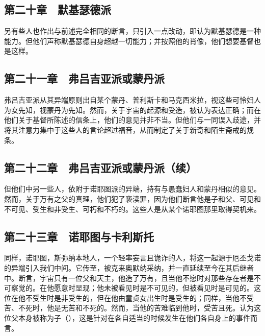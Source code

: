 
\subsection{第二十章　默基瑟德派}

另有些人也作出与前述完全相同的断言，只引入一点改动，即认为默基瑟德是一种能力。但他们声称默基瑟德自身超越一切能力；并按照他的肖像，他们想要基督也是这样。\par


\subsection{第二十一章　弗吕吉亚派或蒙丹派}

弗吕吉亚派从其异端原则出自某个蒙丹、普利斯卡和马克西米拉，视这些可怜妇人为女先知，视蒙丹为先知。然而，关于宇宙的起源和受造，被认为表达正确；而在他们关于基督所陈述的信条上，他们的意见并非不当。但他们与一同误入歧途，并将其注意力集中于这些人的言论超过福音，从而制定了关于新奇和陌生斋戒的规条。\par


\subsection{第二十二章　弗吕吉亚派或蒙丹派（续）}

但他们中另一些人，依附于诺耶图派的异端，持有与愚蠢妇人和蒙丹相似的意见。然而，关于万有之父的真理，他们犯了亵渎罪，因为他们断言他是子和父、可见和不可见、受生和非受生、可朽和不朽的。这些人是从某个诺耶图那里取得契机来。\par


\subsection{第二十三章　诺耶图与卡利斯托}

同样，诺耶图，斯弥纳本地人，一个轻率妄言且诡诈的人，将这一起源于厄丕戈诺的异端引入我们中间。它传至，被克来奥默纳采纳，并一直延续至今在其后继者中。\newline{}断言，宇宙只有一位父和天主，他造了万有，且当他不愿时对那些存在者是不可察觉的。在他愿意时显现；他未被看见时是不可见的，但被看见时是可见的。这位在他不受生时是非受生的，但在他由童贞女出生时是受生的；同样，当他不受苦、不死时，他是无苦和不死的。然而，当他的苦难临到他时，受苦且死。认为这位父本身被称为子（），这是针对在各自适当的时候发生在他们各自身上的事件而言。\par

